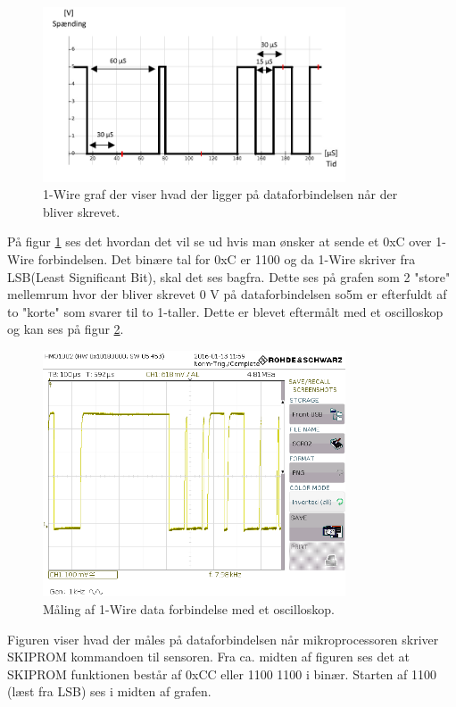 \begin{figure}[h!]
  \centering
  \includegraphics[width=0.8\textwidth]{figures/onewire.png}
  \caption{1-Wire graf der viser hvad der ligger på dataforbindelsen når der bliver skrevet.}
  \label{onewire_graph}
\end{figure}

På figur \ref{onewire_graph} ses det hvordan det vil se ud hvis man ønsker at sende et 0xC over 1-Wire forbindelsen. Det binære tal for 0xC er 1100 og da 1-Wire skriver fra LSB(Least Significant Bit), skal det ses bagfra. Dette ses på grafen som 2 "store" mellemrum hvor der bliver skrevet 0 V på dataforbindelsen so5m er efterfuldt af to "korte" som svarer til to 1-taller. \newline Dette er blevet eftermålt med et oscilloskop og kan ses på figur \ref{SCR02}.


\begin{figure}[h!]
  \centering
  \includegraphics[width=0.8\textwidth]{figures/SCR02.png}
  \caption{Måling af 1-Wire data forbindelse med et oscilloskop.}
  \label{SCR02}
\end{figure}

Figuren viser hvad der måles på dataforbindelsen når mikroprocessoren skriver SKIPROM kommandoen til sensoren.
Fra ca. midten af figuren ses det at SKIPROM funktionen består af 0xCC eller 1100 1100 i binær. Starten af 1100 (læst fra LSB) ses i midten af grafen.